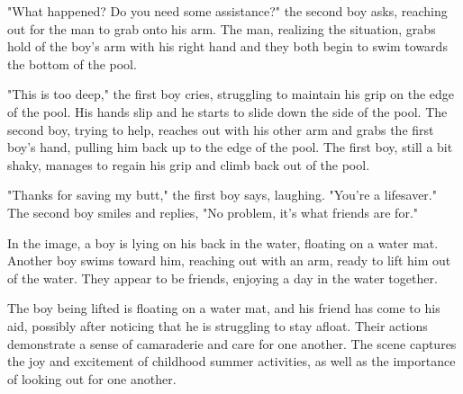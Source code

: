 \documentclass[smalldemyvopaper,11pt,twoside,onecolumn,openright,extrafontsizes]{memoir}
\begin{document}
"What happened? Do you need some assistance?" the second boy asks, reaching out for the man to grab onto his arm. The man, realizing the situation, grabs hold of the boy's arm with his right hand and they both begin to swim towards the bottom of the pool.\par
"This is too deep," the first boy cries, struggling to maintain his grip on the edge of the pool. His hands slip and he starts to slide down the side of the pool. The second boy, trying to help, reaches out with his other arm and grabs the first boy's hand, pulling him back up to the edge of the pool. The first boy, still a bit shaky, manages to regain his grip and climb back out of the pool.\par
"Thanks for saving my butt," the first boy says, laughing. "You're a lifesaver." The second boy smiles and replies, "No problem, it's what friends are for."\par
In the image, a boy is lying on his back in the water, floating on a water mat. Another boy swims toward him, reaching out with an arm, ready to lift him out of the water. They appear to be friends, enjoying a day in the water together.\par
The boy being lifted is floating on a water mat, and his friend has come to his aid, possibly after noticing that he is struggling to stay afloat. Their actions demonstrate a sense of camaraderie and care for one another. The scene captures the joy and excitement of childhood summer activities, as well as the importance of looking out for one another.\par
\end{document}
